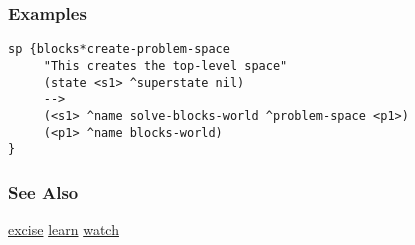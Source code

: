 \subsubsection*{Examples}
\begin{verbatim}
sp {blocks*create-problem-space   
     "This creates the top-level space"
     (state <s1> ^superstate nil)
     -->
     (<s1> ^name solve-blocks-world ^problem-space <p1>)
     (<p1> ^name blocks-world)
}
\end{verbatim}
\subsubsection*{See Also}
\hyperref[excise]{excise} \hyperref[learn]{learn} \hyperref[watch]{watch} 